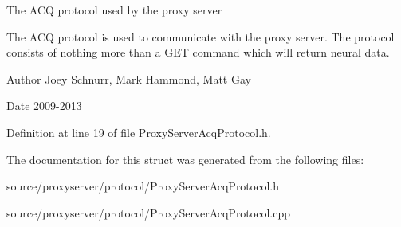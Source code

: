 The A\-C\-Q protocol used by the proxy server

The A\-C\-Q protocol is used to communicate with the proxy server. The protocol consists of nothing more than a G\-E\-T command which will return neural data. \begin{DoxyAuthor}{Author}
Joey Schnurr, Mark Hammond, Matt Gay 
\end{DoxyAuthor}
\begin{DoxyDate}{Date}
2009-\/2013 
\end{DoxyDate}


Definition at line 19 of file Proxy\-Server\-Acq\-Protocol.\-h.



The documentation for this struct was generated from the following files\-:\begin{DoxyCompactItemize}
\item 
source/proxyserver/protocol/Proxy\-Server\-Acq\-Protocol.\-h\item 
source/proxyserver/protocol/Proxy\-Server\-Acq\-Protocol.\-cpp\end{DoxyCompactItemize}
